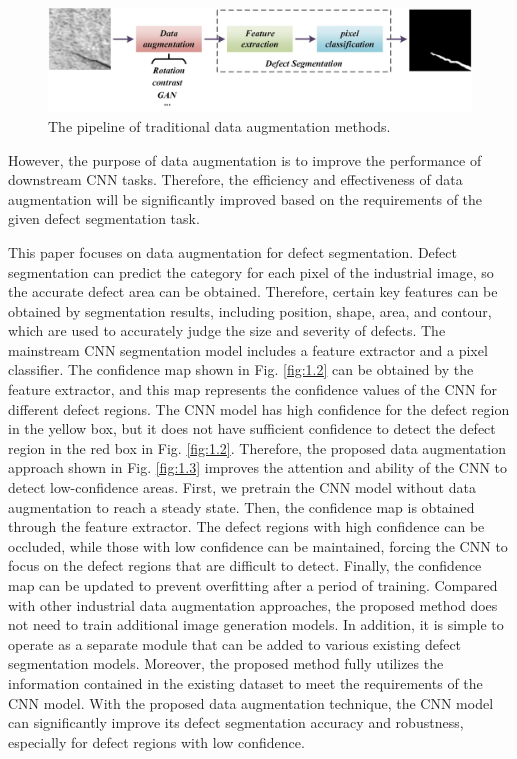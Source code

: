 \documentclass[sn-mathphys]{sn-jnl}%
\theoremstyle{thmstyleone}%
\theoremstyle{thmstyletwo}%
\theoremstyle{thmstylethree}%
\begin{document}
\begin{figure}
\centering
\includegraphics[width=4.5in]{fig1.jpg}
\caption{The pipeline of traditional data augmentation methods.}\label{fig:1.1}
\end{figure}

However, the purpose of data augmentation is to improve the performance of downstream CNN tasks. Therefore, the efficiency and effectiveness of data augmentation will be significantly improved based on the requirements of the given defect segmentation task.



This paper focuses on data augmentation for defect segmentation. Defect segmentation can predict the category for each pixel of the industrial image, so the accurate defect area can be obtained. Therefore, certain key features can be obtained by segmentation results, including position, shape, area, and contour, which are used to accurately judge the size and severity of defects. The mainstream CNN segmentation model includes a feature extractor and a pixel classifier. The confidence map shown in Fig. \ref{fig:1.2} can be obtained by the feature extractor, and this map represents the confidence values of the CNN for different defect regions. The CNN model has high confidence for the defect region in the yellow box, but it does not have sufficient confidence to detect the defect region in the red box in Fig. \ref{fig:1.2}.
Therefore, the proposed data augmentation approach shown in Fig. \ref{fig:1.3} improves the attention and ability of the CNN to detect low-confidence areas.
First, we pretrain the CNN model without data augmentation to reach a steady state. Then, the confidence map is obtained through the feature extractor. The defect regions with high confidence can be occluded, while those with low confidence can be maintained, forcing the CNN to focus on the defect regions that are difficult to detect. Finally, the confidence map can be updated to prevent overfitting after a period of training. Compared with other industrial data augmentation approaches, the proposed method does not need to train additional image generation models. In addition, it is simple to operate as a separate module that can be added to various existing defect segmentation models. Moreover, the proposed method fully utilizes the information contained in the existing dataset to meet the requirements of the CNN model. With the proposed data augmentation technique, the CNN model can significantly improve its defect segmentation accuracy and robustness, especially for defect regions with low confidence.
\end{document}
